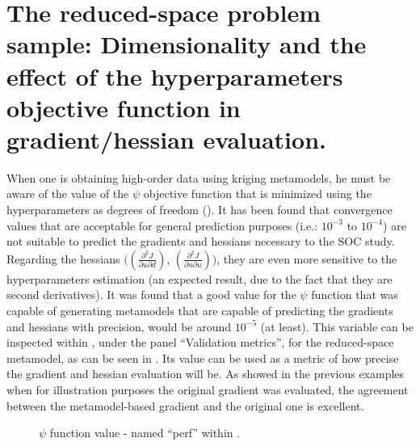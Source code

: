 \documentclass[../msc-thesis.tex]{subfiles}
\begin{document}
\section{The reduced-space problem sample: Dimensionality and the effect of 
the \kriging hyperparameters objective function in gradient/hessian 
evaluation.}

When one is obtaining high-order data using kriging metamodels, he must be aware 
of the value of the $\psi$ objective function that is minimized using the 
hyperparameters as degrees of freedom (). It has been found that 
convergence values that are acceptable for general prediction purposes 
(i.e.: $10^{-3}$ to $10^{-4}$) are not suitable to predict the gradients and 
hessians necessary to the SOC study. Regarding the hessians 
$(\left(\frac{\partial^{2} J}{\partial u \partial d}\right)$, 
$\left(\frac{\partial^{2} J}{\partial u \partial u}\right))$, they are even more 
sensitive to the hyperparameters estimation (an expected result, due to the fact 
that they are second derivatives). It was found that a good value for 
the $\psi$ function that was capable of generating metamodels that are capable 
of predicting the gradients and hessians with precision, would be around 
$10^{-5}$ (at least). This variable can be inspected within \mtc, 
under the panel ``Validation metrics'', for the reduced-space metamodel, as can 
be seen in . Its value can be used as a metric of how 
precise the gradient and hessian evaluation will be. As showed in the previous 
examples when for illustration purposes the original gradient was evaluated, 
the agreement between the metamodel-based gradient and the original one is 
excellent.

\begin{figure}[htb]
    \centering
    \caption{$\psi$ function value - named ``perf'' within \mtc.}
    \label{fig:perf}
\end{figure}

\FloatBarrier
\end{document}
